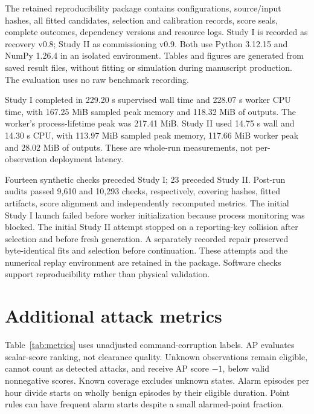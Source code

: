 \documentclass[11pt]{article}
\begin{document}
The retained reproducibility package contains configurations, source/input hashes, all fitted candidates, selection and calibration records, score seals, complete outcomes, dependency versions and resource logs. Study I is recorded as recovery v0.8; Study II as commissioning v0.9. Both use Python 3.12.15 and NumPy 1.26.4 in an isolated environment. Tables and figures are generated from saved result files, without fitting or simulation during manuscript production. The evaluation uses no raw benchmark recording.

Study I completed in 229.20 s supervised wall time and 228.07 s worker CPU time, with 167.25 MiB sampled peak memory and 118.32 MiB of outputs. The worker's process-lifetime peak was 217.41 MiB. Study II used 14.75 s wall and 14.30 s CPU, with 113.97 MiB sampled peak memory, 117.66 MiB worker peak and 28.02 MiB of outputs. These are whole-run measurements, not per-observation deployment latency.

Fourteen synthetic checks preceded Study I; 23 preceded Study II. Post-run audits passed 9,610 and 10,293 checks, respectively, covering hashes, fitted artifacts, score alignment and independently recomputed metrics. The initial Study I launch failed before worker initialization because process monitoring was blocked. The initial Study II attempt stopped on a reporting-key collision after selection and before fresh generation. A separately recorded repair preserved byte-identical fits and selection before continuation. These attempts and the numerical replay environment are retained in the package. Software checks support reproducibility rather than physical validation.

\section{Additional attack metrics}\label{app:metrics}
Table~\ref{tab:metrics} uses unadjusted command-corruption labels. AP evaluates scalar-score ranking, not clearance quality. Unknown observations remain eligible, cannot count as detected attacks, and receive AP score $-1$, below valid nonnegative scores. Known coverage excludes unknown states. Alarm episodes per hour divide starts on wholly benign episodes by their eligible duration. Point rules can have frequent alarm starts despite a small alarmed-point fraction.

\begin{table}[htbp]\centering\small
\caption{Study I: additional metrics. All methods have 237,600 eligible observations and 135 intervention events.}\label{tab:metrics}
\setlength{\tabcolsep}{3pt}

\end{table}
\end{document}
